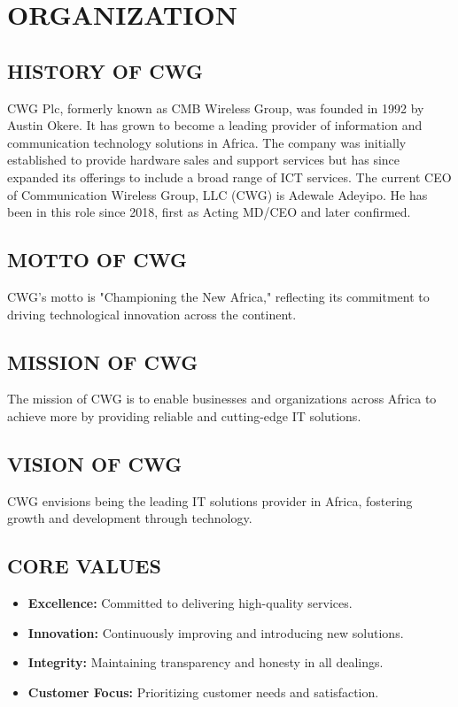 \documentclass[a4paper,12pt]{report}
\begin{document}
\chapter[Chapter 2]{ORGANIZATION}
\section[History]{HISTORY OF CWG}
CWG Plc, formerly known as CMB Wireless Group, was founded in 1992 by Austin Okere. It has grown to become a leading provider of information and communication technology solutions in Africa. The company was initially established to provide hardware sales and support services but has since expanded its offerings to include a broad range of ICT services.
The current CEO of Communication Wireless Group, LLC (CWG) is Adewale Adeyipo. He has been in this role since 2018, first as Acting MD/CEO and later confirmed.

\section[Motto]{MOTTO OF CWG}
CWG’s motto is "Championing the New Africa," reflecting its commitment to driving technological innovation across the continent.

\section[Mission]{MISSION OF CWG}
The mission of CWG is to enable businesses and organizations across Africa to achieve more by providing reliable and cutting-edge IT solutions.

\section[Vision]{VISION OF CWG}
CWG envisions being the leading IT solutions provider in Africa, fostering growth and development through technology.

\section[Core values]{CORE VALUES}
\begin{itemize}
    \item \textbf{Excellence:} Committed to delivering high-quality services.
    \item \textbf{Innovation:} Continuously improving and introducing new solutions.
    \item \textbf{Integrity:} Maintaining transparency and honesty in all dealings.
    \item \textbf{Customer Focus:} Prioritizing customer needs and satisfaction.
\end{itemize}
\end{document}
